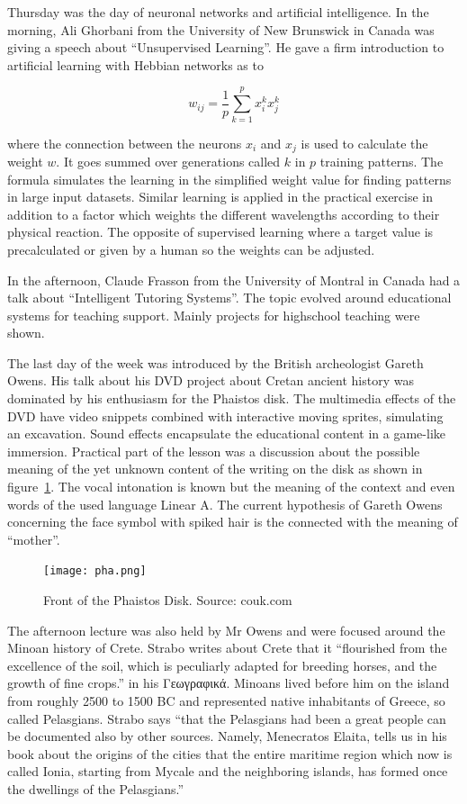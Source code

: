 \documentclass[bibtotocnumbered, headsepline,normalheadings,12pt]{report}
\newcommand{\gdir}%
   {\foreignlanguage{polutonikogreek}}
\begin{document}
Thursday was the day of neuronal networks and artificial intelligence. In the morning, Ali Ghorbani from the University of New Brunswick in Canada was 
giving a speech about ``Unsupervised Learning''. He gave a firm introduction to artificial learning with Hebbian networks as to

\[ w_{ij} = \frac{1}{p} \sum_{k=1}^p x_i^k x_j^k\]

where the connection between the neurons \(x_i\) and \(x_j\) is used to calculate the weight \( w \). It goes summed over generations called \( k \) in \( p \) 
training patterns. The formula simulates the learning in the simplified weight value for finding patterns in large input datasets. Similar learning is 
applied in the practical exercise in addition to a factor which weights the different wavelengths according to their physical reaction.
The opposite of supervised learning where a target value is precalculated or given by a human so the weights can be adjusted.


In the afternoon, Claude Frasson from the University of Montral in Canada had a talk
about ``Intelligent Tutoring Systems''. The topic evolved around educational systems for teaching support. Mainly projects for highschool teaching 
were shown.

The last day of the week was introduced by the British archeologist Gareth Owens. His talk about his DVD project about Cretan ancient history 
was dominated by his enthusiasm for the Phaistos disk. The multimedia effects of the DVD have video snippets combined with interactive moving sprites, 
simulating an excavation. Sound effects encapsulate the educational content in a game-like immersion. Practical part of the lesson was a discussion about
the possible meaning of the yet unknown content of the writing on the disk as shown in figure~\ref{fig:pha}. The vocal intonation is known but the 
meaning of the context and even words of the used language Linear A. The current hypothesis of Gareth Owens concerning the face symbol with 
spiked hair is the connected with the meaning of ``mother''.


\begin{figure}[H]
    \centering
    \texttt{[image: pha.png]}%
    \caption{Front of the Phaistos Disk. Source: couk.com}
    \label{fig:pha}%
\end{figure}

The afternoon lecture was also held by Mr Owens and were focused around the Minoan history of Crete. Strabo writes about Crete that it ``flourished from the 
excellence of the soil, which is peculiarly adapted for breeding horses, and the growth of fine crops.'' in his \gdir{Γεωγραφικά}. Minoans lived 
before him on the island from roughly 2500 to 1500 BC and represented native inhabitants of Greece, so called Pelasgians. Strabo says ``that the Pelasgians had been a great people can be documented also by other sources. Namely, Menecratos Elaita, tells us in his book about the origins of the cities that the entire maritime region which now is called Ionia, starting from Mycale and the neighboring islands, has formed once the dwellings of the Pelasgians.''
\end{document}
